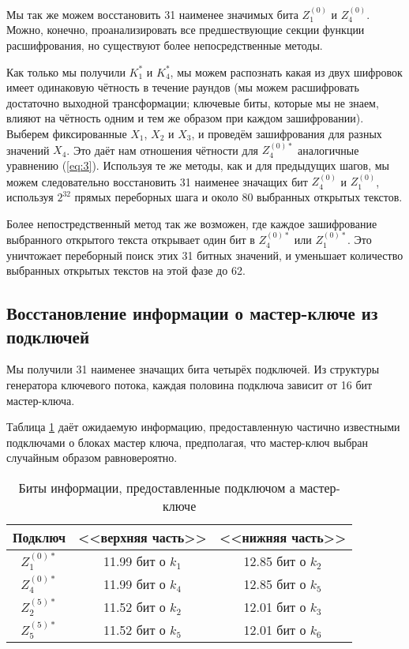 \documentclass[12pt, a4paper]{article}
\begin{document}
Мы так же можем восстановить 31 наименее значимых бита $Z^{(0)}_1$ и $Z^{(0)}_4$. Можно, конечно, проанализировать все предшествующие секции функции расшифрования, но существуют более непосредственные методы.

Как только мы получили $K^*_1$ и $K^*_4$, мы можем распознать какая из двух шифровок имеет одинаковую чётность в течение раундов (мы можем расшифровать достаточно выходной трансформации; ключевые биты, которые мы не знаем, влияют на чётность одним и тем же образом при каждом зашифровании). Выберем фиксированные $X_1$, $X_2$ и $X_3$, и проведём зашифрования для разных значений $X_4$.  Это даёт нам отношения чётности для $Z^{(0)*}_4$ аналогичные уравнению (\ref{eq:3}). Используя те же методы, как и для предыдущих шагов, мы можем следовательно восстановить 31 наименее значащих бит $Z^{(0)}_4$ и $Z^{(0)}_1$, используя $2^{32}$ прямых переборных шага и около 80 выбранных открытых текстов.

Более непостредственный метод так же возможен, где каждое зашифрование выбранного открытого текста открывает один бит в $Z^{(0)*}_4$ или $Z^{(0)*}_1$. Это уничтожает переборный поиск этих 31 битных значений, и уменьшает количество выбранных открытых текстов на этой фазе до 62. 

\subsection{Восстановление информации о мастер-ключе из подключей}

Мы получили 31 наименее значащих бита четырёх подключей. Из структуры генератора ключевого потока, каждая половина подключа зависит от 16 бит мастер-ключа.

Таблица \ref{table:t1} даёт ожидаемую информацию, предоставленную частично известными подключами о блоках мастер ключа, предполагая, что мастер-ключ выбран случайным образом равновероятно.

\begin{table}[h]
\center
\caption{Биты информации, предоставленные подключом а мастер-ключе \label{table:t1}}
\begin{tabular}{|ccc|}
\hline
\textbf{Подключ} & \textbf{<<верхняя часть>>} & \textbf{<<нижняя часть>>} \\
\hline
 $Z^{(0)*}_1$ & 11.99 бит о $k_1$ & 12.85 бит о $k_2$ \\
 $Z^{(0)*}_4$ & 11.99 бит о $k_4$ & 12.85 бит о $k_5$ \\
 $Z^{(5)*}_2$ & 11.52 бит о $k_2$ & 12.01 бит о $k_3$ \\
 $Z^{(5)*}_5$ & 11.52 бит о $k_5$ & 12.01 бит о $k_6$ \\
\hline
\end{tabular}
\end{table}
\end{document}
